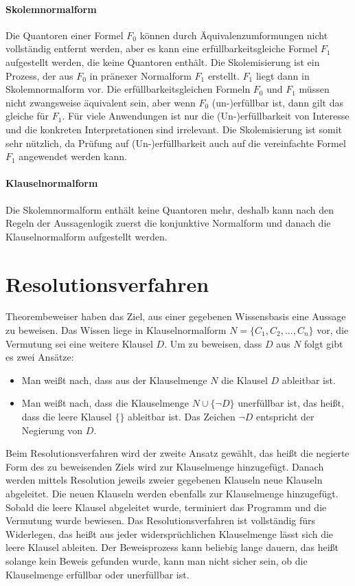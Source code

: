 \paragraph{Skolemnormalform} Die Quantoren einer Formel $F_0$ können durch Äquivalenzumformungen nicht vollständig entfernt werden, aber es kann eine erfüllbarkeitsgleiche Formel $F_1$ aufgestellt werden, die keine Quantoren enthält. Die Skolemisierung ist ein Prozess, der aus $F_0$ in pränexer Normalform $F_1$ erstellt. $F_1$ liegt dann  in Skolemnormalform vor. Die erfüllbarkeitsgleichen Formeln $F_0$ und $F_1$ müssen nicht zwangsweise äquivalent sein, aber wenn $F_0$ (un-)erfüllbar ist, dann gilt das gleiche für $F_1$. Für viele Anwendungen ist nur die (Un-)erfüllbarkeit von Interesse und die konkreten Interpretationen sind irrelevant. Die Skolemisierung ist somit sehr nützlich, da Prüfung auf (Un-)erfüllbarkeit auch auf die vereinfachte Formel $F_1$ angewendet werden kann.
\paragraph{Klauselnormalform}
Die Skolemnormalform enthält keine Quantoren mehr, deshalb kann nach den Regeln der Aussagenlogik zuerst die konjunktive Normalform und danach die Klauselnormalform aufgestellt werden.

	\section{Resolutionsverfahren}

Theorembeweiser haben das Ziel, aus einer gegebenen Wissensbasis eine Aussage zu beweisen. Das Wissen liege in Klauselnormalform $N=\{C_1, C_2, ..., C_n \}$ vor, die Vermutung sei eine weitere Klausel $D$. Um zu beweisen, dass $D$ aus $N$ folgt gibt es zwei Ansätze: 
\begin{itemize}
\item Man weißt nach, dass aus der Klauselmenge $N$ die Klausel $D$ ableitbar ist. 
\item Man weißt nach, dass die Klauselmenge $N\cup\{\neg D\}$  unerfüllbar ist, das heißt, dass die leere Klausel $\{\}$ ableitbar ist. Das Zeichen $\neg D$ entspricht der Negierung von $D$.
\end{itemize}

Beim Resolutionsverfahren wird der zweite Ansatz gewählt, das heißt die negierte Form des zu beweisenden Ziels wird zur Klauselmenge hinzugefügt. Danach werden mittels Resolution jeweils zweier gegebenen Klauseln neue Klauseln abgeleitet. Die neuen Klauseln werden ebenfalls zur Klauselmenge hinzugefügt. Sobald die leere Klausel abgeleitet wurde, terminiert das Programm und die Vermutung wurde bewiesen. Das Resolutionsverfahren ist vollständig fürs Widerlegen, das heißt aus jeder widersprüchlichen Klauselmenge lässt sich die leere Klausel ableiten. Der Beweisprozess kann beliebig lange dauern, das heißt solange kein Beweis gefunden wurde, kann man nicht sicher sein, ob die Klauselmenge erfüllbar oder unerfüllbar ist. \cite{Chang1973Symb}

